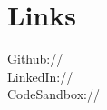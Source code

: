 \documentclass[]{deedy-resume-openfont}
\begin{document}
\begin{minipage}[t]{0.33\textwidth}

\section{Links}
Github:// \href{https://github.com/mikelockz}{} \\
LinkedIn://  \href{https://www.linkedin.com/in/mlockwitz}{} \\
CodeSandbox://  \href{https://codesandbox.io/u/MikeLockz}{} \\
\sectionsep




%
%

\end{minipage}
\hfill
\end{document}
